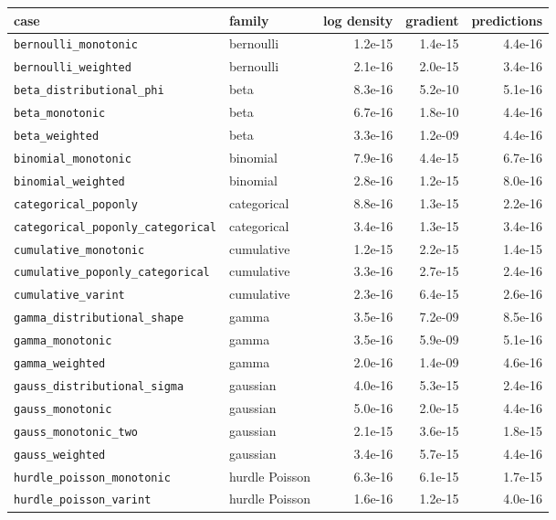 \documentclass[11pt]{article}
\newcommand{\code}[1]{\texttt{#1}}
\begin{document}
\begin{table}[tbp]
\scriptsize\setlength{\tabcolsep}{4pt}
\begin{center}\begin{tabular}{@{}llrrr@{}}
\toprule
case & family & log density & gradient & predictions \\
\midrule
\code{bernoulli\_monotonic} & bernoulli & 1.2e-15 & 1.4e-15 & 4.4e-16 \\
\code{bernoulli\_weighted} & bernoulli & 2.1e-16 & 2.0e-15 & 3.4e-16 \\
\code{beta\_distributional\_phi} & beta & 8.3e-16 & 5.2e-10 & 5.1e-16 \\
\code{beta\_monotonic} & beta & 6.7e-16 & 1.8e-10 & 4.4e-16 \\
\code{beta\_weighted} & beta & 3.3e-16 & 1.2e-09 & 4.4e-16 \\
\code{binomial\_monotonic} & binomial & 7.9e-16 & 4.4e-15 & 6.7e-16 \\
\code{binomial\_weighted} & binomial & 2.8e-16 & 1.2e-15 & 8.0e-16 \\
\code{categorical\_poponly} & categorical & 8.8e-16 & 1.3e-15 & 2.2e-16 \\
\code{categorical\_poponly\_categorical} & categorical & 3.4e-16 & 1.3e-15 & 3.4e-16 \\
\code{cumulative\_monotonic} & cumulative & 1.2e-15 & 2.2e-15 & 1.4e-15 \\
\code{cumulative\_poponly\_categorical} & cumulative & 3.3e-16 & 2.7e-15 & 2.4e-16 \\
\code{cumulative\_varint} & cumulative & 2.3e-16 & 6.4e-15 & 2.6e-16 \\
\code{gamma\_distributional\_shape} & gamma & 3.5e-16 & 7.2e-09 & 8.5e-16 \\
\code{gamma\_monotonic} & gamma & 3.5e-16 & 5.9e-09 & 5.1e-16 \\
\code{gamma\_weighted} & gamma & 2.0e-16 & 1.4e-09 & 4.6e-16 \\
\code{gauss\_distributional\_sigma} & gaussian & 4.0e-16 & 5.3e-15 & 2.4e-16 \\
\code{gauss\_monotonic} & gaussian & 5.0e-16 & 2.0e-15 & 4.4e-16 \\
\code{gauss\_monotonic\_two} & gaussian & 2.1e-15 & 3.6e-15 & 1.8e-15 \\
\code{gauss\_weighted} & gaussian & 3.4e-16 & 5.7e-15 & 4.4e-16 \\
\code{hurdle\_poisson\_monotonic} & hurdle Poisson & 6.3e-16 & 6.1e-15 & 1.7e-15 \\
\code{hurdle\_poisson\_varint} & hurdle Poisson & 1.6e-16 & 1.2e-15 & 4.0e-16 \\

\end{tabular}
\end{center}
\end{table}
\end{document}
